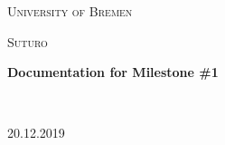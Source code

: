 \documentclass[12pt,a4paper]{report}%
\begin{document}
\begin{titlepage}
{
	\centering
	{\scshape\LARGE University of Bremen \par}
	\vspace{1cm}
	{\scshape\Large Suturo \par}
	\vspace{1.5cm}
	{\huge\bfseries Documentation for Milestone \#1 \par}
	\vspace{2cm}
	\hfill
	\\
	{20.12.2019 \par}
}
\end{titlepage}


\tableofcontents













\end{document}
